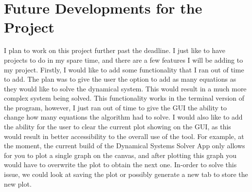 \documentclass[12pt]{report}
\begin{document}
\section{Future Developments for the Project}
I plan to work on this project further past the deadline. I just like to have projects to do in my spare time, and there are a few features I will be adding to my project. Firstly, I would like to add some functionality that I ran out of time to add. The plan was to give the user the option to add as many equations as they would like to solve the dynamical system. This would result in a much more complex system being solved. This functionality works in the terminal version of the program, however, I just ran out of time to give the GUI the ability to change how many equations the algorithm had to solve. I would also like to add the ability for the user to clear the current plot showing on the GUI, as this would result in better accessibility to the overall use of the tool. For example, at the moment, the current build of the Dynamical Systems Solver App only allows for you to plot a single graph on the canvas, and after plotting this graph you would have to overwrite the plot to obtain the next one. In-order to solve this issue, we could look at saving the plot or possibly generate a new tab to store the new plot.
\end{document}
